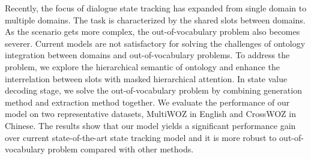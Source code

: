 Recently, the focus of dialogue state tracking has expanded from single domain to multiple domains. The task is characterized by the shared slots between domains. As the scenario gets more complex, the out-of-vocabulary problem also becomes severer. Current models are not satisfactory for solving the challenges of ontology integration between domains and out-of-vocabulary problems. To address the problem, we explore the hierarchical semantic of ontology and enhance the interrelation between slots with masked hierarchical attention. In state value decoding stage, we solve the out-of-vocabulary problem by combining generation method and extraction method together. We evaluate the performance of our model on two representative datasets, MultiWOZ in English and CrossWOZ in Chinese. The results show that our model yields a significant performance gain over current state-of-the-art state tracking model and it is more robust to out-of-vocabulary problem compared with other methods.
